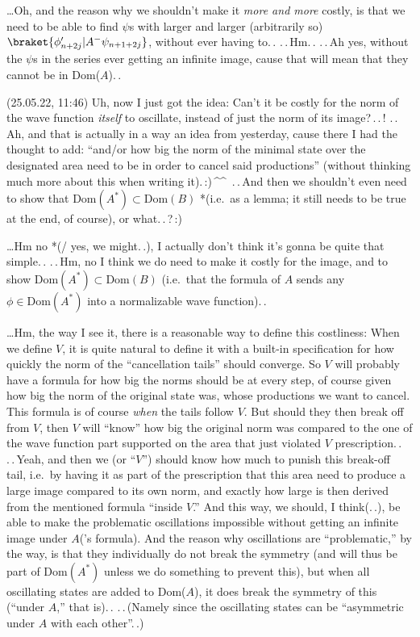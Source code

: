 \documentclass{report}
\begin{document}
\ldots Oh, and the reason why we shouldn't make it \emph{more and more} costly, is that we need to be able to find $\psi$s with larger and larger (arbitrarily so) 
$\braket{\phi'_{n+2j} | A^- \psi_{n+1+2j}}$, without ever having to.\,. .\,.\,Hm.\,. .\,.\,Ah yes, without the $\psi$s in the series ever getting an infinite image, cause that will mean that they cannot be in Dom($A$).\,. 


(25.05.22, 11:46) Uh, now I just got the idea: Can't it be costly for the norm of the wave function \emph{itself} to oscillate, instead of just the norm of its image?\,.\,.\,! 
.\,.\,Ah, and that is actually in a way an idea from yesterday, cause there I had the thought to add: ``and/or how big the norm of the minimal state over the designated area need to be in order to cancel said productions'' (without thinking much more about this when writing it).\,:)\,\textasciicircum\textasciicircum\ 
.\,.\,And then we shouldn't even need to show that $\mathrm{Dom}(A^*)\subset\mathrm{Dom}(B)$ *(i.e.\ as a lemma; it still needs to be true at the end, of course), or what.\,.\,?\,:) %

\ldots Hm no *(/ yes, we might.\,.), I actually don't think it's gonna be quite that simple.\,. .\,.\,Hm, no I think we do need to make it costly for the image, and to show $\mathrm{Dom}(A^*)\subset\mathrm{Dom}(B)$ (i.e.\ that the formula of $A$ sends any $\phi\in\mathrm{Dom}(A^*)$ into a normalizable wave function).\,. 

\ldots Hm, the way I see it, there is a reasonable way to define this costliness: When we define $V$, it is quite natural to define it with a built-in specification for how quickly the norm of the ``cancellation tails'' should converge. So $V$ will probably have a formula for how big the norms should be at every step, of course given how big the norm of the original state was, whose productions we want to cancel. This formula is of course \emph{when} the tails follow $V$. But should they then break off from $V$, then $V$ will ``know'' how big the original norm was compared to the one of the wave function part supported on the area that just violated $V$ prescription.\,. .\,.\,Yeah, and then we (or ``$V$'') should know how much to punish this break-off tail, i.e.\ by having it as part of the prescription that this area need to produce a large image compared to its own norm, and exactly how large is then derived from the mentioned formula ``inside $V$.'' And this way, we should, I think(.\,.), be able to make the problematic oscillations impossible without getting an infinite image under $A$('s formula). And the reason why oscillations are ``problematic,'' by the way, is that they individually do not break the symmetry (and will thus be part of Dom$(A^*)$ unless we do something to prevent this), but when all oscillating states are added to Dom($A$), it does break the symmetry of this (``under $A$,'' that is).\,.  .\,.\,(Namely since the oscillating states can be ``asymmetric under $A$ with each other''.\,.) 
\end{document}
